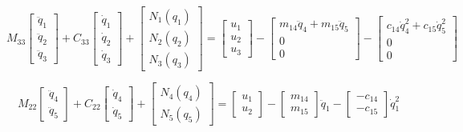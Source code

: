 {\[
M_{33}\left[\begin{array}{c}
\ddot{q}_{1}\\
\ddot{q}_{2}\\
\ddot{q}_{3}\end{array}\right]+C_{33}\left[\begin{array}{c}
\dot{q}_{1}\\
\dot{q}_{2}\\
\dot{q}_{3}\end{array}\right]+\left[\begin{array}{c}
N_{1}(q_{1})\\
N_{2}(q_{2})\\
N_{3}(q_{3})\end{array}\right]=\left[\begin{array}{c}
u_{1}\\
u_{2}\\
u_{3}\end{array}\right]-\left[\begin{array}{c}
m_{14}\ddot{q}_{4}+m_{15}\ddot{q}_{5}\\
0\\
0\end{array}\right]-\left[\begin{array}{c}
c_{14}\dot{q}_{4}^{2}+c_{15}\dot{q}_{5}^{2}\\
0\\
0\end{array}\right]
\]

\[
M_{22}\left[\begin{array}{c}
\ddot{q}_{4}\\
\ddot{q}_{5}\end{array}\right]+C_{22}\left[\begin{array}{c}
\dot{q}_{4}\\
\dot{q}_{5}\end{array}\right]+\left[\begin{array}{c}
N_{4}(q_{4})\\
N_{5}(q_{5})\end{array}\right]=\left[\begin{array}{c}
u_{1}\\
u_{2}\end{array}\right]-\left[\begin{array}{c}
m_{14}\\
m_{15}\end{array}\right]\ddot{q}_{1}-\left[\begin{array}{c}
-c_{14}\\
-c_{15}\end{array}\right]\dot{q}_{1}^{2}
\]

}
